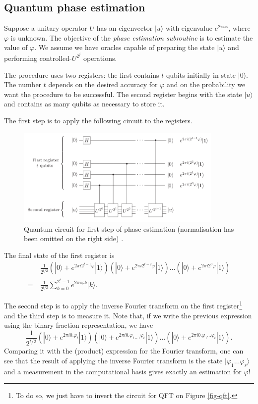 \documentclass[a4paper, 10pt]{article}
\numberwithin{equation}{section}
\numberwithin{figure}{section}
\numberwithin{table}{section}
\begin{document}
\subsection{Quantum phase estimation}

Suppose a unitary operator $U$ has an eigenvector $|u\rangle$ with eigenvalue $e^{2\pi i\varphi}$, where $\varphi$ is unknown. The objective of the \textit{phase estimation subroutine} is to estimate the value of $\varphi$. We assume we have oracles capable of preparing the state $|u\rangle$ and performing controlled-$U^{2^j}$ operations.

The procedure uses two registers: the first contains $t$ qubits initially in state $|0\rangle$. The number $t$ depends on the desired accuracy for $\varphi$ and on the probability we want the procedure to be successful. The second register begins with the state $|u\rangle$ and contains as many qubits as necessary to store it.

The first step is to apply the following circuit to the registers.

\begin{figure}[h!]
	\centering
	\includegraphics[width=10cm]{Figures/phase-estimation-1}
	\caption{Quantum circuit for first step of phase estimation (normalisation has been omitted on the right side) \cite{nielsen}.}
\end{figure}

The final state of the first register is
\begin{align*}
	&\frac{1}{2^{t/2}}\left(|0\rangle+e^{2\pi i2^{t-1}\varphi}|1\rangle\right)\left(|0\rangle+e^{2\pi i2^{t-2}\varphi}|1\rangle\right) \dots \left(|0\rangle+e^{2\pi i2^{0}\varphi}|1\rangle\right)\\
	=\ &\frac{1}{2^{t/2}}\sum_{k=0}^{2^t-1}e^{2\pi i\varphi k}|k\rangle.
\end{align*}

The second step is to apply the inverse Fourier transform on the first register\footnote{To do so, we just have to invert the circuit for QFT on Figure \ref{fig-qft}.} and the third step is to measure it. Note that, if we write the previous expression using the binary fraction representation, we have
$$ \frac{1}{2^{t/2}}\left(|0\rangle+e^{2\pi i0.\varphi_t}|1\rangle\right)\left(|0\rangle+e^{2\pi i0.\varphi_{t-1}\varphi_{t}}|1\rangle\right) \dots \left(|0\rangle+e^{2\pi i0.\varphi_1...\varphi_t}|1\rangle\right). $$
Comparing it with the (product) expression for the Fourier transform, one can see that the result of applying the inverse Fourier transform is the state $|\varphi_1\dots\varphi_r\rangle$ and a measurement in the computational basis gives exactly an estimation for $\varphi$!
\end{document}
